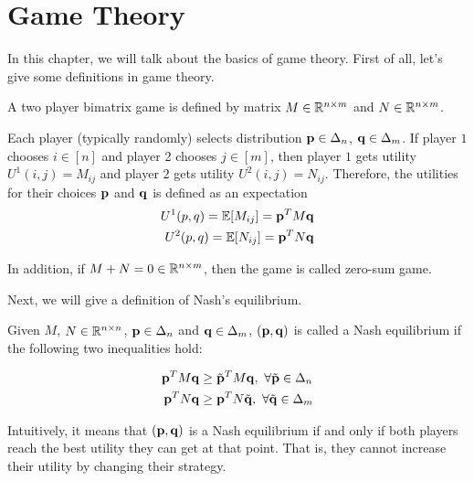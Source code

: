 \documentclass[../main.tex]{subfiles}
\begin{document}
\chapter{Game Theory}
In this chapter, we will talk about the basics of game theory. First of all, let's give some definitions in game theory.

\begin{definition}
	A two player bimatrix game is defined by matrix $M \in \mathbb{R}^{n\times m}$ and $N \in \mathbb{R}^{n\times m}$. 
	
	Each player (typically randomly) selects distribution $\mathbf{p} \in \Delta_n$, $\mathbf{q} \in \Delta_m$. If player $1$ chooses $i\in [n]$ and player 2 chooses $j \in [m]$, then player $1$ gets utility $U^1(i,j) = M_{ij}$ and player $2$ gets utility $U^2(i,j) = N_{ij}$. Therefore, the utilities for their choices $\mathbf{p}$ and $\mathbf{q}$ is defined as an expectation
	\begin{equation}
	\begin{aligned}
	U^1(p,q) = \mathbb{E}[M_{ij}] = \mathbf{p}^T M \mathbf{q} \\
	U^2(p,q) = \mathbb{E}[N_{ij}] = \mathbf{p}^T N\mathbf{q} 
	\end{aligned}
	\end{equation}
\end{definition}
	In addition, if $M + N = 0 \in \mathbb{R}^{n\times m}$, then the game is called zero-sum game.
	
	Next, we will give a definition of Nash's equilibrium.
	
	\begin{definition}
		Given $M$, $N \in \mathbb{R}^{n\times n}$, $\mathbf{p} \in \Delta_n$ and $\mathbf{q} \in \Delta_m$, $(\mathbf{p},\mathbf{q})$ is called a Nash equilibrium if the following two inequalities hold:
		
		\begin{equation}
			\begin{aligned}
				\mathbf{p}^T M \mathbf{q} &\geq \tilde{\mathbf{p}}^T M \mathbf{q},\ \forall \tilde{\mathbf{p}} \in \Delta_n \\
				\mathbf{p}^T N \mathbf{q} &\geq \mathbf{p}^T N \tilde{\mathbf{q}},\ \forall \tilde{\mathbf{q}} \in \Delta_m 
			\end{aligned}
		\end{equation}
		
		Intuitively, it means that $(\mathbf{p}, \mathbf{q})$ is a Nash equilibrium if and only if both players reach the best utility they can get at that point. That is, they cannot increase their utility by changing their strategy.
	\end{definition}
\end{document}

